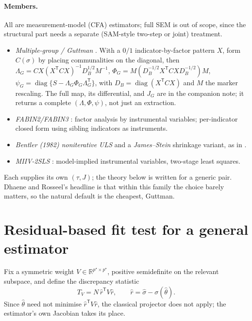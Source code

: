 \documentclass[11pt]{article}
\newcommand{\diag}{\operatorname{diag}}
\newcommand{\T}{^{\mathsf T}}
\newcommand{\Ninv}{^{-1}}
\theoremstyle{plain}
\theoremstyle{definition}
\theoremstyle{remark}
\begin{document}
\paragraph{Members.} All are measurement-model (CFA) estimators; full SEM is out
of scope, since the structural part needs a separate (SAM-style two-step or
joint) treatment.
\begin{itemize}
\item \emph{Multiple-group / Guttman} \cite{guttman1952}. With a $0/1$
  indicator-by-factor pattern $X$, form $C(\sigma)$ by placing communalities on
  the diagonal, then
  $\Lambda_G=CX(X\T CX)\Ninv D_B^{1/2}M\Ninv$,
  $\Phi_G=M(D_B^{-1/2}X\T CXD_B^{-1/2})M$,
  $\psi_G=\diag\{S-\Lambda_G\Phi_G\Lambda_G\T\}$, with $D_B=\diag(X\T CX)$ and
  $M$ the marker rescaling. The full map, its differential, and $J_G$ are in the
  companion note; it returns a complete $(\Lambda,\Phi,\psi)$, not just an
  extraction.
\item \emph{FABIN2/FABIN3} \cite{hagglund1982}: factor analysis by instrumental
  variables; per-indicator closed form using sibling indicators as instruments.
\item \emph{Bentler (1982) noniterative ULS} and a \emph{James--Stein} shrinkage
  variant, as in \cite{dhaene2024}.
\item \emph{MIIV-2SLS} \cite{bollen1996}: model-implied instrumental variables,
  two-stage least squares.
\end{itemize}
Each supplies its own $(\tau,J)$; the theory below is written for a generic
pair. Dhaene and Rosseel's headline is that within this family the choice barely
matters, so the natural default is the cheapest, Guttman.

\section{Residual-based fit test for a general estimator}\label{sec:gof}

Fix a symmetric weight $V\in\mathbb R^{p^\star\times p^\star}$, positive
semidefinite on the relevant subspace, and define the discrepancy statistic
\begin{equation}\label{eq:TV}
  T_V=N\,\hat r\T V\hat r,\qquad \hat r=\hat\sigma-\sigma(\hat\theta).
\end{equation}
Since $\hat\theta$ need not minimise $\hat r\T V\hat r$, the classical
projector does not apply; the estimator's own Jacobian takes its place.
\end{document}
